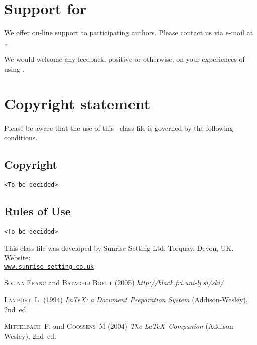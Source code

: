 \documentclass[fonts]{icst}
\begin{document}
\section{Support for \textsf{\journalclass}}
We offer on-line support to participating authors. Please contact
us via e-mail at \dots

We would welcome any feedback, positive or otherwise, on your
experiences of using \textsf{\journalclass}.

\section{Copyright statement}
Please  be  aware that the use of  this \LaTeXe\ class file is
governed by the following conditions.

\subsection{Copyright}
\verb+<To be decided>+

\subsection{Rules of Use}
\verb+<To be decided>+

\ack This class file was developed by Sunrise Setting Ltd,
Torquay, Devon, UK. Website:\\
\href{http://www.sunrise-setting.co.uk}{\texttt{www.sunrise-setting.co.uk}}

\begin{thebibliography}{9}

 \textsc{Solina Franc} and \textsc{Batagelj Borut} (2005) \emph{http://black.fri.uni-lj.si/ski/}

 \textsc{Lamport~L.} (1994) \emph{\LaTeX: a Document Preparation System}
(Addison-Wesley), 2nd~ed.

 \textsc{Mittelbach~F.} and \textsc{Goossens~M} (2004) \emph{The \LaTeX\ Companion} (Addison-Wesley), 2nd~ed.
\end{thebibliography}
\end{document}
